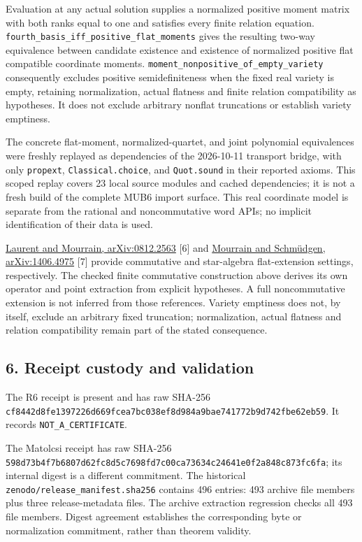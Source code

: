 \documentclass[
]{article}
\begin{document}
Evaluation at any actual solution supplies a normalized positive moment
matrix with both ranks equal to one and satisfies every finite relation
equation. \nolinkurl{fourth_basis_iff_positive_flat_moments} gives the
resulting two-way equivalence between candidate existence and existence
of normalized positive flat compatible coordinate moments.
\nolinkurl{moment_nonpositive_of_empty_variety} consequently excludes
positive semidefiniteness when the fixed real variety is empty,
retaining normalization, actual flatness and finite relation
compatibility as hypotheses. It does not exclude arbitrary nonflat
truncations or establish variety emptiness.

The concrete flat-moment, normalized-quartet, and joint polynomial
equivalences were freshly replayed as dependencies of the 2026-10-11
transport bridge, with only \nolinkurl{propext},
\nolinkurl{Classical.choice}, and \nolinkurl{Quot.sound} in their
reported axioms. This scoped replay covers 23 local source modules and
cached dependencies; it is not a fresh build of the complete MUB6 import
surface. This real coordinate model is separate from the rational and
noncommutative word APIs; no implicit identification of their data is
used.

\href{https://arxiv.org/abs/0812.2563}{Laurent and Mourrain,
arXiv:0812.2563} {[}6{]} and
\href{https://arxiv.org/abs/1406.4975}{Mourrain and Schmüdgen,
arXiv:1406.4975} {[}7{]} provide commutative and star-algebra
flat-extension settings, respectively. The checked finite commutative
construction above derives its own operator and point extraction from
explicit hypotheses. A full noncommutative extension is not inferred
from those references. Variety emptiness does not, by itself, exclude an
arbitrary fixed truncation; normalization, actual flatness and relation
compatibility remain part of the stated consequence.

\subsection{6. Receipt custody and
validation}\label{receipt-custody-and-validation}

The R6 receipt is present and has raw SHA-256
\nolinkurl{cf8442d8fe1397226d669fcea7bc038ef8d984a9bae741772b9d742fbe62eb59}.
It records \nolinkurl{NOT_A_CERTIFICATE}.

The Matolcsi receipt has raw SHA-256
\nolinkurl{598d73b4f7b6807d62fc8d5c7698fd7c00ca73634c24641e0f2a848c873fc6fa};
its internal digest is a different commitment. The historical
\nolinkurl{zenodo/release_manifest.sha256} contains 496 entries: 493
archive file members plus three release-metadata files. The archive
extraction regression checks all 493 file members. Digest agreement
establishes the corresponding byte or normalization commitment, rather
than theorem validity.
\end{document}
